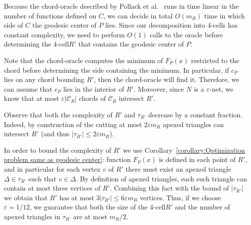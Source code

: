 \documentclass[a4paper]{article}
\newcommand{\F}[2]{\ensuremath{F_{\scriptscriptstyle #1}(#2)}}
\newcommand{\cp}{\ensuremath{c_P}}
\newcommand{\m}{\ensuremath{m_{\scriptscriptstyle R}}}
\newcommand{\reg}{\ensuremath{R'}}
\newcommand{\tcell}{4-cell\xspace}
\newcommand{\tcells}{4-cells\xspace}
\newcommand{\C}{\ensuremath{{\mathcal C_R}}}
\begin{document}
Because the chord-oracle described by Pollack et al.~\cite[Section~3]{pollackComputingCenter} runs in time linear in the number of functions defined on $C$, we can decide in total $O(\m)$ time in which side of $C$ the geodesic center of $P$ lies. 
Since our decomposition into \tcells has constant complexity, 
we need to perform $O(1)$ calls to the oracle before determining the \tcell $\reg$ that contains the geodesic center of $P$. 

Note that the chord-oracle computes the minimum of $\F{P}{x}$ restricted to the chord before determining the side containing the minimum. In particular, if $\cp$ lies on any chord bounding $\reg$, then the chord-oracle will find it. 
Therefore, we can assume that $\cp$ lies in the interior of $\reg$. Moreover, since $N$ is a $\varepsilon$-net, we know that at most $\varepsilon |\C|$ chords of $\C$ intersect $\reg$.





Observe that both the complexity of $\reg$ and $\tau_{\reg}$ decrease by a constant fraction. Indeed, by construction of the cutting at most $2\varepsilon \m$ apexed triangles can intersect $\reg$ (and thus $|\tau_{\reg}|\leq 2\varepsilon \m$). 

In order to bound the complexity of $\reg$ we use Corollary~\ref{corollary:Optimization problem same as geodesic center}: function $\F{P}{x}$  is defined in each point of $\reg$, and in particular for each vertex $v$ of $\reg$ there must exist an apexed triangle $\Delta\in \tau_{R'}$ such that $v\in \Delta$. By definition of apexed triangles, each such triangle can contain at most three vertices of $\reg$. Combining this fact with the bound of $|\tau_{\reg}|$ we obtain that $\reg$ has at most $3|\tau_{\reg}| \leq 6\varepsilon \m$ vertices.
Thus, if we choose $\varepsilon = 1/12$, we guarantee that both the size of the \tcell $\reg$ and the number of apexed triangles in $\tau_{\reg}$ are at most $\m/2$. 
\end{document}
